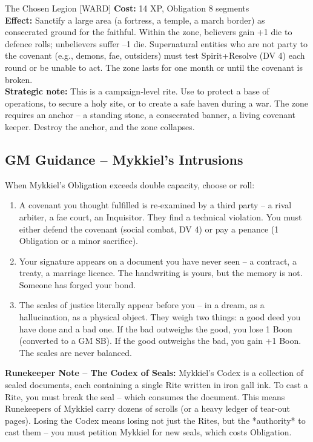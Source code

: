 \documentclass[10pt,a5paper]{book}
\begin{document}
\begin{patronbox}{The Chosen Legion [WARD]}
\textbf{Cost:} 14 XP, Obligation 8 segments \\
\textbf{Effect:} Sanctify a large area (a fortress, a temple, a march border) as consecrated ground for the faithful. Within the zone, believers gain +1 die to defence rolls; unbelievers suffer –1 die. Supernatural entities who are not party to the covenant (e.g., demons, fae, outsiders) must test Spirit+Resolve (DV 4) each round or be unable to act. The zone lasts for one month or until the covenant is broken. \\
\textbf{Strategic note:} This is a campaign‑level rite. Use to protect a base of operations, to secure a holy site, or to create a safe haven during a war. The zone requires an anchor – a standing stone, a consecrated banner, a living covenant keeper. Destroy the anchor, and the zone collapses.
\end{patronbox}

\subsection*{GM Guidance – Mykkiel’s Intrusions}

When Mykkiel’s Obligation exceeds double capacity, choose or roll:
\begin{enumerate}
    \item A covenant you thought fulfilled is re‑examined by a third party – a rival arbiter, a fae court, an Inquisitor. They find a technical violation. You must either defend the covenant (social combat, DV 4) or pay a penance (1 Obligation or a minor sacrifice).
    \item Your signature appears on a document you have never seen – a contract, a treaty, a marriage licence. The handwriting is yours, but the memory is not. Someone has forged your bond.
    \item The scales of justice literally appear before you – in a dream, as a hallucination, as a physical object. They weigh two things: a good deed you have done and a bad one. If the bad outweighs the good, you lose 1 Boon (converted to a GM SB). If the good outweighs the bad, you gain +1 Boon. The scales are never balanced.
\end{enumerate}

\noindent \textbf{Runekeeper Note – The Codex of Seals:}
Mykkiel’s Codex is a collection of sealed documents, each containing a single Rite written in iron gall ink. To cast a Rite, you must break the seal – which consumes the document. This means Runekeepers of Mykkiel carry dozens of scrolls (or a heavy ledger of tear‑out pages). Losing the Codex means losing not just the Rites, but the *authority* to cast them – you must petition Mykkiel for new seals, which costs Obligation.
\end{document}
